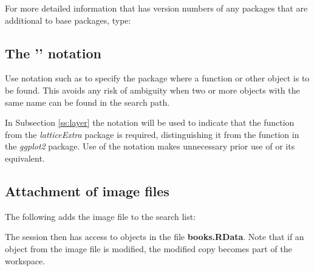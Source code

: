For more detailed information that has version numbers of any packages
that are additional to base packages, type:
\begin{knitrout}
\color{fgcolor}\begin{kframe}
\begin{alltt}
\hlstd{()}
\end{alltt}
\end{kframe}
\end{knitrout}

\subsection*{The '\txtt{::}' notation}
Use notation such as  to specify the package
where a function or other object is to be found.  This avoids any
risk of ambiguity when two or more objects with the same name can
be found in the search path.

In Subsection \ref{ss:layer} the notation 
will be used to indicate that the function  from
the {\em latticeExtra} package is required, distinguishing it
from the function  in the {\em ggplot2} package.
Use of the notation  makes unnecessary
prior use of  or its equivalent.

\subsection*{Attachment of image files}
The following adds the image file  to the search list:
\begin{knitrout}
\color{fgcolor}\begin{kframe}
\begin{alltt}
\hlstd{(}\hlstd{)}
\end{alltt}
\end{kframe}
\end{knitrout}
\noindent
The session then has access to objects in the file
\textbf{books.RData}.
  Note that if an object from the image file is modified,
the modified copy becomes part of the workspace.


